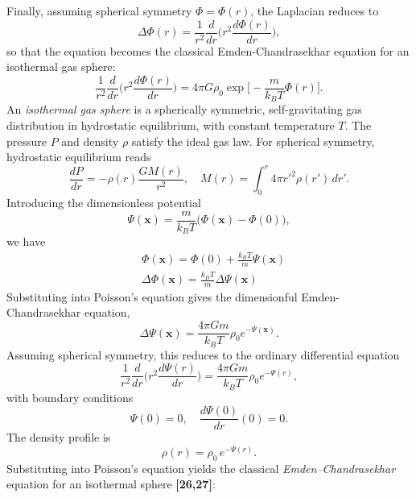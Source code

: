 \documentclass[12pt,a4paper]{article}
\numberwithin{equation}{section}
\begin{document}
Finally, assuming spherical symmetry $\Phi = \Phi(r)$, the Laplacian reduces to
\begin{equation*}
\Delta \Phi(r) = \frac{1}{r^2} \frac{d}{dr} \Big( r^2 \frac{d \Phi(r)}{dr} \Big),
\end{equation*}
so that the equation becomes the classical Emden-Chandrasekhar equation for an isothermal gas sphere:
\begin{equation*}
\frac{1}{r^2} \frac{d}{dr} \Big( r^2 \frac{d \Phi(r)}{dr} \Big) = 4 \pi G \rho_0 \exp\Big[- \frac{m}{k_B T} \Phi(r) \Big].
\end{equation*}
An \emph{isothermal gas sphere} is a spherically symmetric, self-gravitating gas distribution in hydrostatic equilibrium, with constant temperature $T$. The pressure $P$ and density $\rho$ satisfy the ideal gas law. For spherical symmetry, hydrostatic equilibrium reads
\begin{equation*}
\frac{dP}{dr} = - \rho(r) \frac{G M(r)}{r^2}, \quad
M(r) = \int_0^r 4 \pi r'^2 \rho(r') \, dr'.
\end{equation*}
Introducing the dimensionless potential
\begin{equation}
\Psi(\mathbf{x})= \frac{m}{k_B T} \big(\Phi(\mathbf{x}) - \Phi(0)\big),
\end{equation}
we have
\begin{align}
&\Phi(\mathbf{x}) = \Phi(0) + \frac{k_B T}{m} \Psi(\mathbf{x})\\&
\Delta \Phi(\mathbf{x}) = \frac{k_B T}{m} \Delta \Psi(\mathbf{x})
\end{align}
Substituting into Poisson's equation gives the dimensionful Emden-Chandrasekhar equation,
\begin{equation}
\Delta \Psi(\mathbf{x}) = \frac{4 \pi G m}{k_B T} \rho_0 e^{-\Psi(\mathbf{x})}.
\end{equation}
Assuming spherical symmetry, this reduces to the ordinary differential equation
\begin{equation}
\frac{1}{r^2} \frac{d}{dr} \Big( r^2 \frac{d \Psi(r)}{dr} \Big) = \frac{4 \pi G m}{k_B T} \rho_0 e^{-\Psi(r)},
\end{equation}
with boundary conditions
\begin{equation}
\Psi(0) = 0, \quad \frac{d \Psi(0)}{dr}(0) = 0.
\end{equation}
The density profile is
\begin{equation}
\rho(r) = \rho_0 \, e^{-\Psi(r)}.
\end{equation}
Substituting into Poisson's equation yields the classical \emph{Emden--Chandrasekhar} equation for an isothermal sphere \textbf{[26,27]}:
\end{document}
